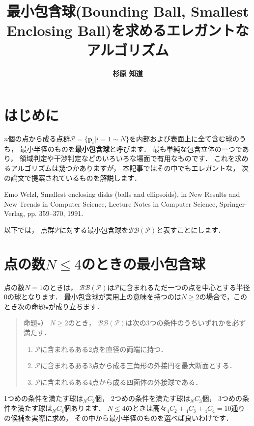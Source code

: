 ﻿\documentclass[a4paper]{jsarticle}
\title{\bf 最小包含球(Bounding Ball, Smallest Enclosing Ball)を求めるエレガントなアルゴリズム}
\author{\Large{\bf 杉原 知道}}
\date{}
\begin{document}
\maketitle
\vspace{-\baselineskip}

\section{はじめに}

$n$個の点から成る点群$\mathcal{P}=\{\boldsymbol{p}_{i}|i=1\sim N\}$を内部および表面上に全て含む球のうち，
最小半径のものを{\bf 最小包含球}と呼びます．
最も単純な包含立体の一つであり，
領域判定や干渉判定などのいろいろな場面で有用なものです．
これを求めるアルゴリズムは幾つかありますが，
本記事ではその中でもエレガントな，
次の論文で提案されているものを解説します．

Emo Welzl, Smallest enclosing disks (balls and ellipsoids), in New Results and New Trends in Computer Science, Lecture Notes in Computer Science, Springer-Verlag, pp. 359--370, 1991.

以下では，
点群$\mathcal{P}$に対する最小包含球を$\mathcal{BB}(\mathcal{P})$と表すことにします．


\section{点の数$N\leq 4$のときの最小包含球}

点の数$N=1$のときは，
$\mathcal{BB}(\mathcal{P})$は$\mathcal{P}$に含まれるただ一つの点を中心とする半径$0$の球となります．
最小包含球が実用上の意味を持つのは$N\geq 2$の場合で，このとき次の命題$\star$が成り立ちます．

\begin{quote}
命題$\star$）
$N\geq 2$のとき，
$\mathcal{BB}(\mathcal{P})$は次の3つの条件のうちいずれかを必ず満たす．
\begin{enumerate}
\item{$\mathcal{P}$に含まれるある2点を直径の両端に持つ．}
\item{$\mathcal{P}$に含まれるある3点から成る三角形の外接円を最大断面とする．}
\item{$\mathcal{P}$に含まれるある4点から成る四面体の外接球である．}
\end{enumerate}
\end{quote}

1つめの条件を満たす球は${}_{N}C_{2}$個，
2つめの条件を満たす球は${}_{N}C_{3}$個，
3つめの条件を満たす球は${}_{N}C_{4}$個あります．
$N\leq 4$のときは高々${}_{4}C_{2}+{}_{4}C_{3}+{}_{4}C_{4}=10$通りの候補を実際に求め，
その中から最小半径のものを選べば良いわけです．
\end{document}
